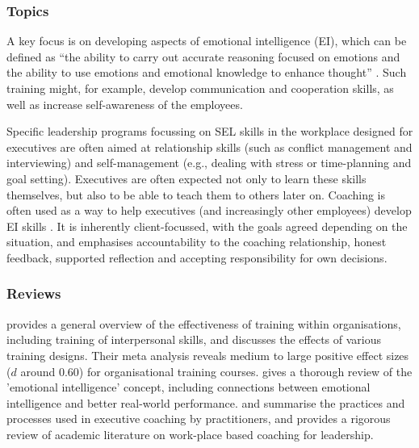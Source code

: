 \documentclass[prodmode,acmtochi]{acmsmall}
\newcommand{\GeraldineFIX}[1]{}
\begin{document}
\subsubsection*{Topics} 
        A key focus is on developing aspects of emotional intelligence (EI), which can be defined as ``the ability to carry out accurate reasoning focused on emotions and the ability to use emotions and emotional knowledge to enhance thought'' \cite{Mayer2008}. Such training might, for example, develop communication and cooperation skills, as well as increase self-awareness of the employees. 
        
        Specific leadership programs focussing on SEL skills in the workplace designed for executives are often aimed at relationship skills (such as conflict management and interviewing) and self-management (e.g., dealing with stress or time-planning and goal setting). Executives are often expected not only to learn these skills themselves, but also to be able to teach them to others later on. Coaching is often used as a way to help executives (and increasingly other employees) develop EI skills \cite{Bono2009}. It is inherently client-focussed, with the goals agreed depending on the situation, and emphasises accountability to the coaching relationship, honest feedback, supported reflection and accepting responsibility for own decisions. 

\GeraldineFIX{G: Not just for executives though in the workplace - this can sound like it is only for execs?    P: That's what the reviews I found focused on ... perhaps still mainly used for execs, as very expensive to roll-out more widely? Or perhaps not that much literature on it?}

\subsubsection*{Reviews}   provides a general overview of the effectiveness of training within organisations, including training of interpersonal skills, and discusses the effects of various training designs. Their meta analysis reveals medium to large positive effect sizes  ($d$ around $0.60$) for organisational training courses.  gives a thorough review of the 'emotional intelligence' concept, including connections between emotional intelligence and better real-world performance.    and  summarise the practices and processes used in executive coaching by practitioners, and  provides a rigorous review of academic literature on work-place based coaching for leadership. \GeraldineFIX{G: ??? seeing you also mention coaching under the personal area?? ... P: But this review really does talk about work-place only, with particular focus on leadership}
\end{document}
